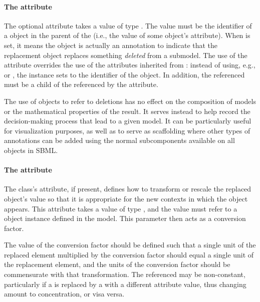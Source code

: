\paragraph{The \fixttspace{} attribute}
\label{replacedelement-deletion}

The optional attribute  takes a value of type
.  The value must be the identifier of a \Deletion
object in the parent \Model of the \ReplacedElement (i.e., the value of
some \Deletion object's  attribute).  When  is
set, it means the \ReplacedElement object is actually an annotation to
indicate that the replacement object replaces something \emph{deleted}
from a submodel.  The use of the  attribute overrides
the use of the attributes inherited from \SBaseRef: instead of using,
e.g.,  or , the \ReplacedElement instance
sets  to the identifier of the \Deletion object.  In
addition, the referenced \Deletion must be a child of the \Submodel
referenced by the  attribute.

The use of \ReplacedElement objects to refer to deletions has no effect
on the composition of models or the mathematical properties of the
result.  It serves instead to help record the decision-making process
that lead to a given model.  It can be particularly useful for
visualization purposes, as well as to serve as scaffolding where other
types of annotations can be added using the normal \Annotation
subcomponents available on all \SBase objects in SBML.




\paragraph{The \fixttspace{} attribute}
\label{replacedelement-conversionfactor}

The \ReplacedElement class's  attribute, if
present, defines how to transform or rescale the replaced object's value
so that it is appropriate for the new contexts in which the object
appears.  This attribute takes a value of type , and
the value must refer to a \Parameter object instance defined in the
model.  This parameter then acts as a conversion factor.

The value of the conversion factor should be defined such that a single
unit of the replaced element multiplied by the conversion factor should
equal a single unit of the replacement element, and the units of the
conversion factor should be commensurate with that transformation.  The
referenced \Parameter may be non-constant, particularly if a \Species is
replaced by a \Species with a different 
attribute value, thus changing amount to concentration, or visa versa.

